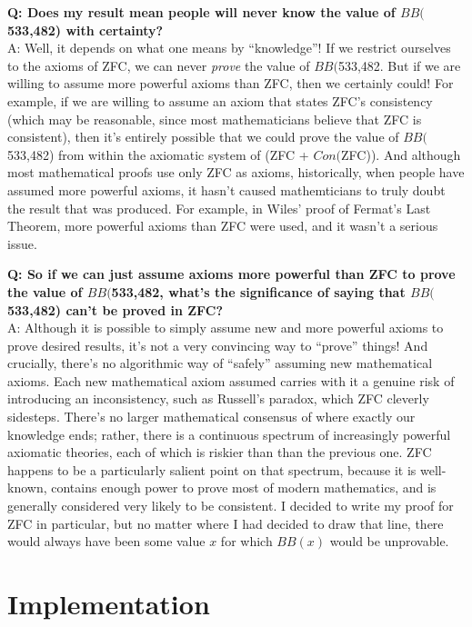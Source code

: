 \documentclass{report}
\newcommand{\bbstatenum}{$BB($533,482) }
\newcommand{\bbstatenumcomma}{$BB($533,482, }
\newcommand{\bbstatenumperiod}{$BB($533,482. }
\begin{document}
\textbf{Q: Does my result mean people will never know the value of \bbstatenum with certainty?} \\

A: Well, it depends on what one means by ``knowledge''! If we restrict ourselves to the axioms of ZFC, we can never \emph{prove} the value of \bbstatenumperiod But if we are willing to assume more powerful axioms than ZFC, then we certainly could! For example, if we are willing to assume an axiom that states ZFC's consistency (which may be reasonable, since most mathematicians believe that ZFC is consistent), then it's entirely possible that we could prove the value of \bbstatenum from within the axiomatic system of (ZFC + $Con($ZFC)). And although most mathematical proofs use only ZFC as axioms, historically, when people have assumed more powerful axioms, it hasn't caused mathemticians to truly doubt the result that was produced. For example, in Wiles' proof of Fermat's Last Theorem, more powerful axioms than ZFC were used, and it wasn't a serious issue. %

\textbf{Q: So if we can just assume axioms more powerful than ZFC to prove the value of \bbstatenumcomma what's the significance of saying that \bbstatenum can't be proved in ZFC?} \\

A: Although it is possible to simply assume new and more powerful axioms to prove desired results, it's not a very convincing way to ``prove'' things! And crucially, there's no algorithmic way of ``safely'' assuming new mathematical axioms. Each new mathematical axiom assumed carries with it a genuine risk of introducing an inconsistency, such as Russell's paradox, which ZFC cleverly sidesteps. %
There's no larger mathematical consensus of where exactly our knowledge ends; rather, there is a continuous spectrum of increasingly powerful axiomatic theories, each of which is riskier than than the previous one. ZFC happens to be a particularly salient point on that spectrum, because it is well-known, contains enough power to prove most of modern mathematics, and is generally considered very likely to be consistent. I decided to write my proof for ZFC in particular, but no matter where I had decided to draw that line, there would always have been some value $x$ for which $BB(x)$ would be unprovable. 

\chapter{Implementation \label{sec:implementation}}
\end{document}
